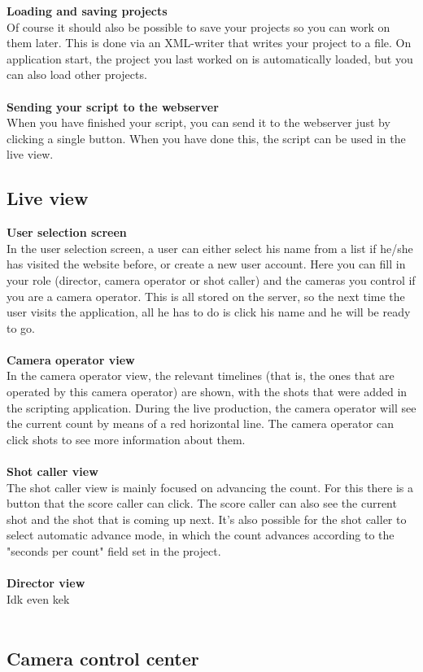 \textbf{Loading and saving projects}\\
Of course it should also be possible to save your projects so you can work on them later. This is done via an XML-writer that writes your project to a file. On application start, the project you last worked on is automatically loaded, but you can also load other projects.\\\\
\textbf{Sending your script to the webserver}\\
When you have finished your script, you can send it to the webserver just by clicking a single button. When you have done this, the script can be used in the live view.


\subsection*{Live view}
\textbf{User selection screen}\\
In the user selection screen, a user can either select his name from a list if he/she has visited the website before, or create a new user account. Here you can fill in your role (director, camera operator or shot caller) and the cameras you control if you are a camera operator. This is all stored on the server, so the next time the user visits the application, all he has to do is click his name and he will be ready to go.\\\\
\textbf{Camera operator view}\\
In the camera operator view, the relevant timelines (that is, the ones that are operated by this camera operator) are shown, with the shots that were added in the scripting application. During the live production, the camera operator will see the current count by means of a red horizontal line. The camera operator can click shots to see more information about them.\\\\
\textbf{Shot caller view}\\
The shot caller view is mainly focused on advancing the count. For this there is a button that the score caller can click. The score caller can also see the current shot and the shot that is coming up next. It's also possible for the shot caller to select automatic advance mode, in which the count advances according to the "seconds per count" field set in the project.\\\\
\textbf{Director view}\\
Idk even kek\\\\


\subsection*{Camera control center}
